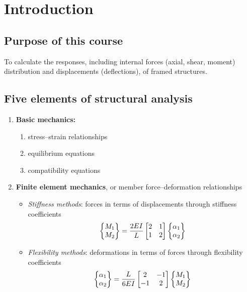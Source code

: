 \chapter{Introduction}

\section{Purpose of this course}
To calculate the responses, including internal forces (axial, shear, moment) distribution and displacements (deflections), of framed structures.

\section{Five elements of structural analysis}
\begin{enumerate}
  \item \textbf{Basic mechanics:}
    \begin{enumerate}[label=(\alph*)]
      \item stress--strain relationships
      \item equilibrium equations
      \item compatibility equations
    \end{enumerate}
  \item \textbf{Finite element mechanics}, or member force--deformation relationships
    \begin{fig}
      
    \end{fig}
    \begin{itemize}
      \item \emph{Stiffness methods}: forces in terms of displacements through stiffness coefficients
        \begin{equation}
          \begin{Bmatrix}M_1\\ M_2\end{Bmatrix} = \frac{2EI}{L}\begin{bmatrix}2 & 1\\ 1 & 2\end{bmatrix}\begin{Bmatrix}\alpha_1\\ \alpha_2\end{Bmatrix}
        \end{equation}
      \item \emph{Flexibility methods}: deformations in terms of forces through flexibility coefficients
        \begin{equation}
          \begin{Bmatrix}\alpha_1\\ \alpha_2\end{Bmatrix} = \frac{L}{6EI}\begin{bmatrix}2 & -1\\ -1 & 2\end{bmatrix}\begin{Bmatrix}M_1\\ M_2\end{Bmatrix}
        \end{equation}

\end{itemize}
\end{enumerate}
